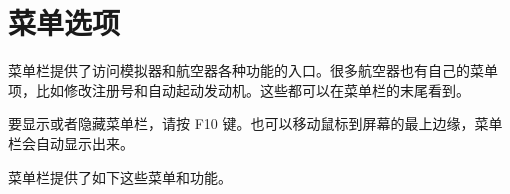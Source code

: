 \ifchinese
\section{菜单选项}
\fi

{}

\ifchinese
菜单栏提供了访问模拟器和航空器各种功能的入口。很多航空器也有自己的菜单项，比如修改注册号和自动起动发动机。这些都可以在菜单栏的末尾看到。

要显示或者隐藏菜单栏，请按 F10 键。也可以移动鼠标到屏幕的最上边缘，菜单栏会自动显示出来。

菜单栏提供了如下这些菜单和功能。
\fi

{}

